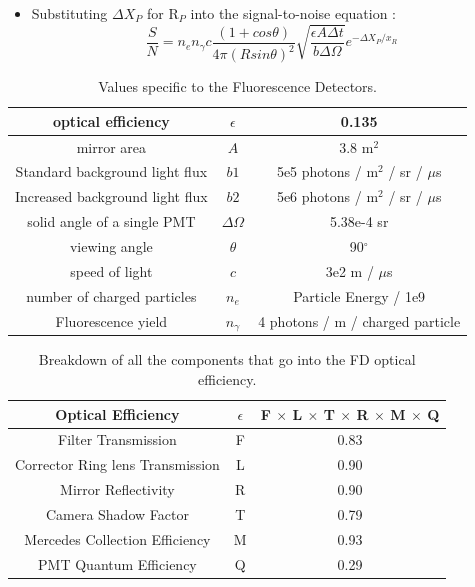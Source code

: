 \begin{itemize}
\item Substituting $\Delta X_P$ for R$_P$ into the signal-to-noise equation    :
\begin{equation}
\frac{S}{N} = n_e n_{\gamma} c \frac{(1 + cos\theta)}{4 \pi (R sin\theta)^2} \sqrt{\frac{\epsilon A \Delta t}{b \Delta\Omega}} e^{-\Delta X_P / x_R}
\end{equation}
\end{itemize}

\begin{table}[h]
\centering
\begin{tabular}{|c|c|c|}
\hline
optical efficiency & $\epsilon$ & 0.135 \\ \hline
mirror area & $A$ & 3.8 m$^2$ \\ \hline
Standard background light flux & $b1$ & 5e5 photons / m$^2$ / sr / $\mu$s \\ \hline
Increased background light flux & $b2$ & 5e6 photons / m$^2$ / sr / $\mu$s \\ \hline
solid angle of a single PMT & $\Delta\Omega$ & 5.38e-4 sr \\ \hline
viewing angle & $\theta$ & 90$^\circ$ \\ \hline
speed of light & $c$ & 3e2 m / $\mu$s \\ \hline
number of charged particles & $n_e$ & Particle Energy / 1e9 \\ \hline
Fluorescence yield & $n_{\gamma}$ & 4 photons / m / charged particle\\ \hline
\end{tabular}
\caption{Values specific to the Fluorescence Detectors.}
\end{table}

\begin{table}[h]
\centering
\begin{tabular}{|c|c|c|}
\hline
Optical Efficiency & $\epsilon$ & F $\times$ L $\times$ T $\times$ R $\times$ M $\times$ Q \\ \hline
Filter Transmission & F & 0.83 \\ \hline
Corrector Ring lens Transmission & L & 0.90 \\ \hline
Mirror Reflectivity & R & 0.90 \\ \hline
Camera Shadow Factor & T & 0.79 \\ \hline
Mercedes Collection Efficiency & M & 0.93 \\ \hline
PMT Quantum Efficiency & Q & 0.29 \\ \hline
\end{tabular}
\caption{Breakdown of all the components that go into the FD optical efficiency.}
\end{table}



